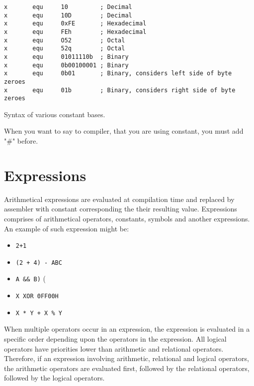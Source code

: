     \begin{code}[h!]
    {
        \usecodefont

        \verb'x       equ     10         ; Decimal'\\
        \verb'x       equ     10D        ; Decimal'\\
        \verb'x       equ     0xFE       ; Hexadecimal'\\
        \verb'x       equ     FEh        ; Hexadecimal'\\
        \verb'x       equ     O52        ; Octal'\\
        \verb'x       equ     52q        ; Octal'\\
        \verb'x       equ     01011110b  ; Binary'\\
        \verb'x       equ     0b00100001 ; Binary'\\
        \verb'x       equ     0b01       ; Binary, considers left side of byte zeroes'\\
        \verb'x       equ     01b        ; Binary, considers right side of byte zeroes'

        \caption{Syntax of various constant bases.}
        \label{code:svcb}
    }
    \end{code}

    When you want to say to compiler, that you are using constant, you must add "\#" before.

\clearpage
\section{Expressions}
    Arithmetical expressions are evaluated at compilation time and replaced by assembler with constant corresponding the their resulting value. Expressions comprises of arithmetical operators, constants, symbols and another expressions. An example of such expression might be:

    \begin{itemize}
        \item \texttt{2+1}
        \item \texttt{(2 + 4) - ABC}
        \item \texttt{A \&\& B)} (
        \item \texttt{X XOR 0FF00H}
        \item \texttt{X * Y + X \% Y}
    \end{itemize}

    When multiple operators occur in an expression, the expression is evaluated in a specific order depending upon the operators in the expression. All logical operators have priorities lower than arithmetic and relational operators. Therefore, if an expression involving arithmetic, relational and logical operators, the arithmetic operators are evaluated first, followed by the relational operators, followed by the logical operators.

